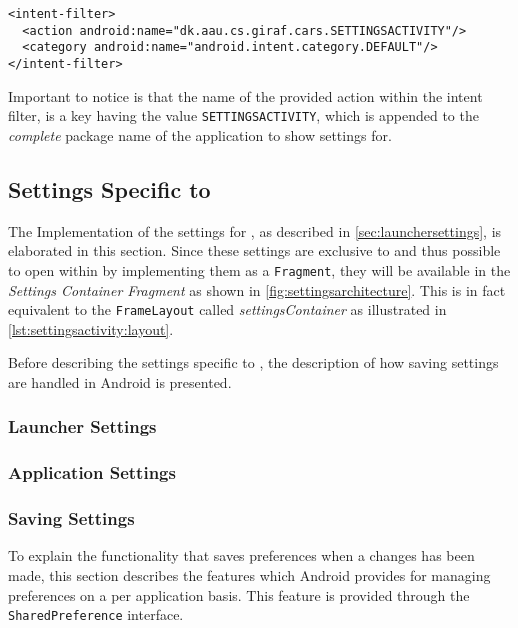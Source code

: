 \begin{lstlisting}[caption={The intent filter and action a \giraf application has to provide to be shown in settings.}, label={lst:intentfilterxml}]
<intent-filter>
  <action android:name="dk.aau.cs.giraf.cars.SETTINGSACTIVITY"/>
  <category android:name="android.intent.category.DEFAULT"/>
</intent-filter>
\end{lstlisting}

Important to notice is that the name of the provided action within the intent filter, is a key having the value \lstinline|SETTINGSACTIVITY|, which is appended to the \textit{complete} package name of the application to show settings for.

\subsection{Settings Specific to \launcher}
The Implementation of the settings for \launcher, as described in \cref{sec:launchersettings}, is elaborated in this section.
Since these settings are exclusive to \launcher and thus possible to open within \settingsactivity by implementing them as a \lstinline|Fragment|, they will be available in the \textit{Settings Container Fragment} as shown in \cref{fig:settingsarchitecture}.
This is in fact equivalent to the \lstinline|FrameLayout| called \textit{settingsContainer} as illustrated in \cref{lst:settingsactivity:layout}.

Before describing the settings specific to \launcher, the description of how saving settings are handled in Android is presented.


\subsubsection{Launcher Settings}


\subsubsection{Application Settings}


\subsubsection{Saving Settings}\label{para:sprint4:managingsettingsandroid}
To explain the functionality that saves preferences when a changes has been made, this section describes the features which Android provides for managing preferences on a per application basis. This feature is provided through the \lstinline|SharedPreference| interface.

